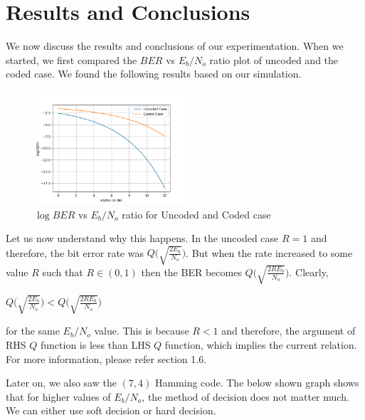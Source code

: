 \documentclass[twocolumn]{report}
\begin{document}
\section{Results and Conclusions}
We now discuss the results and conclusions of our experimentation. When we started, we first compared the $BER$ vs $E_{b}/N_{o}$ ratio plot of uncoded and the coded case. We found the following results based on our simulation.
\begin{figure}[H]
\includegraphics[width=0.5\textwidth, height=0.3\textheight]{codedvsuncoded.png}
\caption{$\log{BER}$ vs $E_{b}/N_{o}$ ratio for Uncoded and Coded case}
\end{figure}
Let us now understand why this happens. In the uncoded case $R=1$ and therefore, the bit error rate was $\displaystyle Q\Bigg(\sqrt{\frac{2E_{b}}{N_{o}}}\Bigg)$. But when the rate increased to some value $R$ such that $R \in (0,1)$ then the BER becomes $\displaystyle Q\Bigg(\sqrt{\frac{2RE_{b}}{N_{o}}}\Bigg)$. Clearly, 
\begin{center}
$\displaystyle Q\Bigg(\sqrt{\frac{2E_{b}}{N_{o}}}\Bigg) < \displaystyle Q\Bigg(\sqrt{\frac{2RE_{b}}{N_{o}}}\Bigg)$
\end{center}
for the same $E_{b}/N_{o}$ value. This is because $R<1$ and therefore, the argument of RHS $Q$ function is less than LHS $Q$ function, which implies the current relation. For more information, please refer section 1.6.
\par Later on, we also saw the $(7, 4)$ Hamming code. The below shown graph shows that for higher values of $E_{b}/N_{o}$, the method of decision does not matter much. We can either use soft decision or hard decision.
\end{document}
